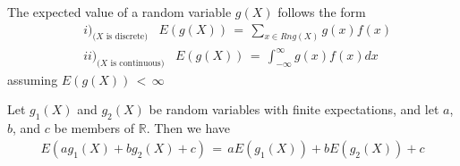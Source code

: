 \begin{definition}
    The expected value of a random variable $g(X)$ follows the form
    \begin{align*}
        &i)_\text{($X$ is discrete)} \hspace{10pt} E(g(X)) \hspace{2pt} = \hspace{2pt} \sum_{x \in Rng(X)} g(x)f(x) \\[2ex]
        &ii)_\text{($X$ is continuous)} \hspace{10pt} E(g(X)) \hspace{2pt} = \hspace{2pt} \int_{-\infty}^{\infty} g(x)f(x)dx
    \end{align*}
    assuming $E(g(X)) \hspace{2pt} < \hspace{2pt} \infty$
\end{definition}

\begin{theorem}
    Let $g_{1}(X)$ and $g_{2}(X)$ be random variables with finite expectations, and let $a$, $b$, and $c$ be members of $\mathbb{R}$. Then we have
    \begin{align*}
        E(ag_{1}(X) + bg_{2}(X) + c) \hspace{2pt} = \hspace{2pt} aE(g_{1}(X)) + bE(g_{2}(X)) + c
    \end{align*}
\end{theorem}

    
